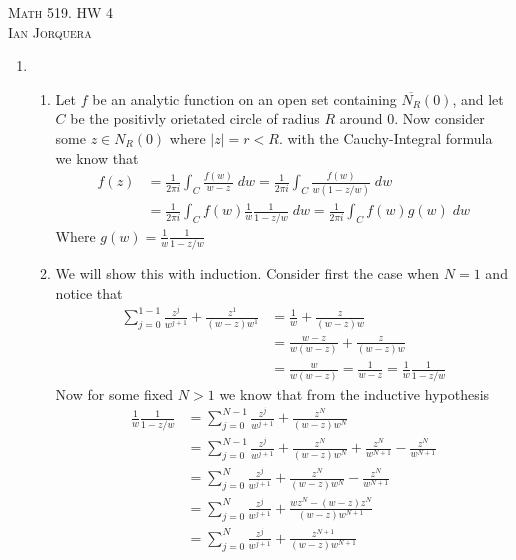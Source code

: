 \documentclass[12pt]{amsart}
\theoremstyle{definition}
\begin{document}
\begin{center}
    \textsc{Math 519. HW 4\\ Ian Jorquera}
\end{center}
\vspace{1em}

\begin{enumerate}

\item 
    \begin{enumerate}

    \item Let $f$ be an analytic function on an open set containing $\overline{N_R}(0)$, and let $C$ be the positivly orietated circle of radius $R$ around $0$. Now consider some $z\in N_R(0)$ where $|z|=r<R$. with the Cauchy-Integral formula we know that 
    \begin{align*}
        f(z)&=\frac{1}{2\pi i}\int_C \frac{f(w)}{w-z}\;dw=\frac{1}{2\pi i}\int_C \frac{f(w)}{w(1-z/w)}\;dw\\
        &=\frac{1}{2\pi i}\int_C f(w)\frac{1}{w}\frac{1}{1-z/w}\;dw=\frac{1}{2\pi i}\int_C f(w)g(w)\;dw
    \end{align*}
    Where $g(w)=\frac{1}{w}\frac{1}{1-z/w}$\\

    \item We will show this with induction. Consider first the case when $N=1$ and notice that 
    \begin{align*} %
        \sum_{j=0}^{1-1}\frac{z^j}{w^{j+1}}+\frac{z^1}{(w-z)w^1}&=\frac{1}{w}+\frac{z}{(w-z)w}\\
        &=\frac{w-z}{w(w-z)}+\frac{z}{(w-z)w}\\
        &=\frac{w}{w(w-z)}=\frac{1}{w-z}=\frac{1}{w}\frac{1}{1-z/w}
    \end{align*}
    Now for some fixed $N>1$ we know that from the inductive hypothesis 
    \begin{align*}
        \frac{1}{w}\frac{1}{1-z/w}&=\sum_{j=0}^{N-1}\frac{z^j}{w^{j+1}}+\frac{z^N}{(w-z)w^N}\\
        &=\sum_{j=0}^{N-1}\frac{z^j}{w^{j+1}}+\frac{z^N}{(w-z)w^N}+\frac{z^N}{w^{N+1}}-\frac{z^N}{w^{N+1}}\\
        &=\sum_{j=0}^{N}\frac{z^j}{w^{j+1}}+\frac{z^N}{(w-z)w^N}-\frac{z^N}{w^{N+1}}\\
        &=\sum_{j=0}^{N}\frac{z^j}{w^{j+1}}+\frac{wz^N-(w-z)z^N}{(w-z)w^{N+1}}\\
        &=\sum_{j=0}^{N}\frac{z^j}{w^{j+1}}+\frac{z^{N+1}}{(w-z)w^{N+1}}\\
    \end{align*}


\end{enumerate}
\end{enumerate}
\end{document}
